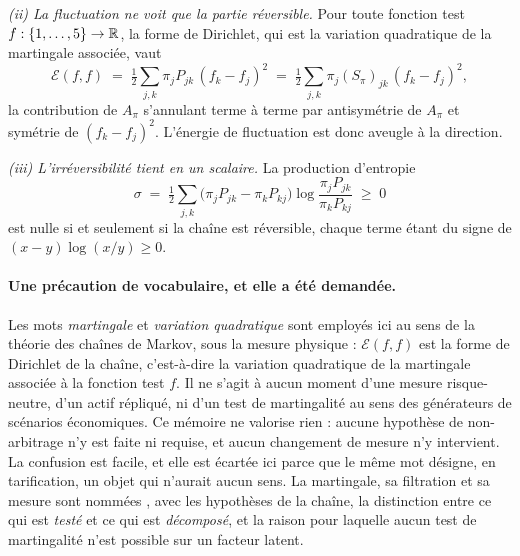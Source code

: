 \emph{(ii) La fluctuation ne voit que la partie réversible.} Pour toute fonction test
$f:\{1,\dots,5\}\to\mathbb{R}$, la forme de Dirichlet, qui est la variation quadratique de la martingale
associée, vaut
\begin{equation}
  \mathcal{E}(f,f) \;=\; \tfrac12\sum_{j,k}\pi_j P_{jk}\,(f_k-f_j)^2
                  \;=\; \tfrac12\sum_{j,k}\pi_j (S_\pi)_{jk}\,(f_k-f_j)^2 ,
  \label{eq:dirichlet}
\end{equation}
la contribution de $A_\pi$ s'annulant terme à terme par antisymétrie de $A_\pi$ et symétrie de
$(f_k-f_j)^2$. L'énergie de fluctuation est donc aveugle à la direction.

\emph{(iii) L'irréversibilité tient en un scalaire.} La production d'entropie
\begin{equation}
  \sigma \;=\; \tfrac12\sum_{j,k}\bigl(\pi_j P_{jk}-\pi_k P_{kj}\bigr)
                \log\frac{\pi_j P_{jk}}{\pi_k P_{kj}} \;\geq\; 0
  \label{eq:entropie}
\end{equation}
est nulle si et seulement si la chaîne est réversible, chaque terme étant du signe de
$(x-y)\log(x/y)\geq 0$.

\paragraph{Une précaution de vocabulaire, et elle a été demandée.} Les mots \emph{martingale} et
\emph{variation quadratique} sont employés ici au sens de la théorie des chaînes de Markov, sous
la mesure physique : $\mathcal{E}(f,f)$ est la forme de Dirichlet de la chaîne, c'est-à-dire
la variation quadratique de la martingale associée à la fonction test $f$. Il ne s'agit à aucun
moment d'une mesure risque-neutre, d'un actif répliqué, ni d'un \og{}test de
martingalité\fg{} au sens des générateurs de scénarios économiques. Ce mémoire ne valorise
rien : aucune hypothèse de non-arbitrage n'y est faite ni requise, et aucun changement de
mesure n'y intervient. La confusion est facile, et elle est écartée ici
parce que le même mot désigne, en tarification, un objet qui n'aurait aucun sens. La
martingale, sa filtration et sa mesure sont nommées \matcomp, avec les hypothèses de la
chaîne, la distinction entre ce qui est \emph{testé} et ce qui est \emph{décomposé}, et la
raison pour laquelle aucun test de martingalité n'est possible sur un facteur latent.

